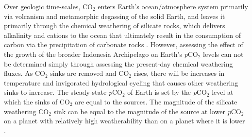 \documentclass[11pt,letterpaper]{article}
\newcommand{\pCOtwo}{\textit{p}CO$_{2}$\xspace}
\newcommand{\COtwo}{CO$_{2}$\xspace}
\begin{document}
Over geologic time-scales, \COtwo enters Earth's ocean/atmosphere system primarily via volcanism and metamorphic degassing of the solid Earth, and leaves it primarily through the chemical weathering of silicate rocks, which delivers alkalinity and cations to the ocean that ultimately result in the consumption of carbon via the precipitation of carbonate rocks \citep{Kump2000a}. However, assessing the effect of the growth of the broader Indonesia Archipelago on Earth's \pCOtwo levels can not be determined simply through assessing the present-day chemical weathering fluxes. As \COtwo sinks are removed and \COtwo rises, there will be increases in temperature and invigorated hydrological cycling that causes other weathering sinks to increase. The steady-state \pCOtwo of Earth is set by the \pCOtwo level at which the sinks of \COtwo are equal to the sources. The magnitude of the silicate weathering \COtwo sink can be equal to the magnitude of the source at lower \pCOtwo on a planet with relatively high weatherability than on a planet where it is lower \citep{Kump1997a}.

\end{document}
